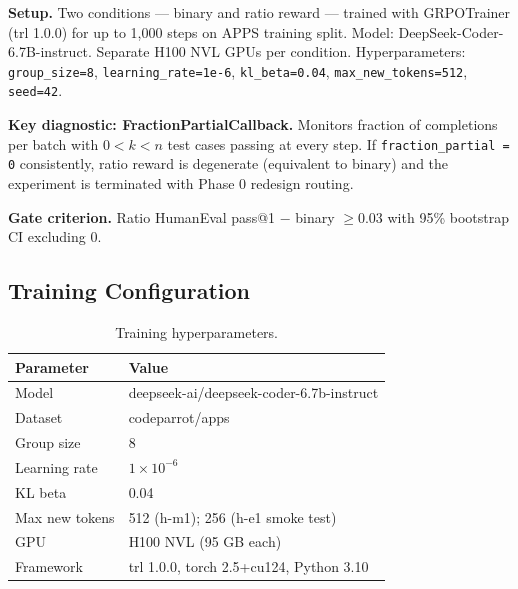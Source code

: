 \textbf{Setup.} Two conditions --- binary and ratio reward --- trained with GRPOTrainer (trl 1.0.0) for up to 1,000 steps on APPS training split. Model: DeepSeek-Coder-6.7B-instruct. Separate H100 NVL GPUs per condition. Hyperparameters: \texttt{group\_size=8}, \texttt{learning\_rate=1e-6}, \texttt{kl\_beta=0.04}, \texttt{max\_new\_tokens=512}, \texttt{seed=42}.

\textbf{Key diagnostic: FractionPartialCallback.} Monitors fraction of completions per batch with $0 < k < n$ test cases passing at every step. If \texttt{fraction\_partial = 0} consistently, ratio reward is degenerate (equivalent to binary) and the experiment is terminated with Phase 0 redesign routing.

\textbf{Gate criterion.} Ratio HumanEval pass@1 $-$ binary $\geq 0.03$ with 95\% bootstrap CI excluding 0.

\subsection{Training Configuration}

\begin{table}[h]
\centering
\caption{Training hyperparameters.}
\label{tab:config}
\begin{tabular}{ll}
\toprule
\textbf{Parameter} & \textbf{Value} \\
\midrule
Model & deepseek-ai/deepseek-coder-6.7b-instruct \\
Dataset & codeparrot/apps \\
Group size & 8 \\
Learning rate & $1 \times 10^{-6}$ \\
KL beta & 0.04 \\
Max new tokens & 512 (h-m1); 256 (h-e1 smoke test) \\
GPU & H100 NVL (95 GB each) \\
Framework & trl 1.0.0, torch 2.5+cu124, Python 3.10 \\
\bottomrule
\end{tabular}
\end{table}
